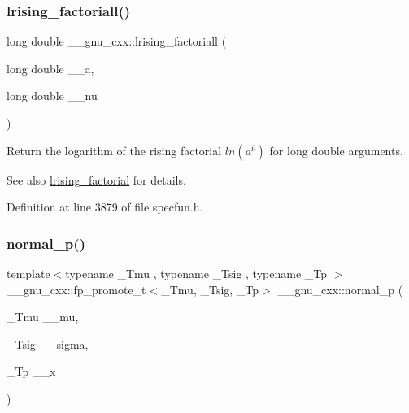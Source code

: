 \subsubsection{\texorpdfstring{lrising\+\_\+factoriall()}{lrising\_factoriall()}}
{\footnotesize\ttfamily long double \+\_\+\+\_\+gnu\+\_\+cxx\+::lrising\+\_\+factoriall (\begin{DoxyParamCaption}\item[{long double}]{\+\_\+\+\_\+a,  }\item[{long double}]{\+\_\+\+\_\+nu }\end{DoxyParamCaption})\hspace{0.3cm}{\ttfamily [inline]}}

Return the logarithm of the rising factorial $ ln(a^{\overline{\nu}}) $ for {\ttfamily  long double } arguments.

\begin{DoxySeeAlso}{See also}
\hyperlink{group__gnu__math__spec__func_ga8912b75b2f7592fb61128c766e7313b9}{lrising\+\_\+factorial} for details. 
\end{DoxySeeAlso}


Definition at line 3879 of file specfun.\+h.

\mbox{\label{group__gnu__math__spec__func_gaeb735b0fb98c7684ba61b8940f50193c}} 
\subsubsection{\texorpdfstring{normal\+\_\+p()}{normal\_p()}}
{\footnotesize\ttfamily template$<$typename \+\_\+\+Tmu , typename \+\_\+\+Tsig , typename \+\_\+\+Tp $>$ \\
\+\_\+\+\_\+gnu\+\_\+cxx\+::fp\+\_\+promote\+\_\+t$<$\+\_\+\+Tmu, \+\_\+\+Tsig, \+\_\+\+Tp$>$ \+\_\+\+\_\+gnu\+\_\+cxx\+::normal\+\_\+p (\begin{DoxyParamCaption}\item[{\+\_\+\+Tmu}]{\+\_\+\+\_\+mu,  }\item[{\+\_\+\+Tsig}]{\+\_\+\+\_\+sigma,  }\item[{\+\_\+\+Tp}]{\+\_\+\+\_\+x }\end{DoxyParamCaption})\hspace{0.3cm}{\ttfamily [inline]}}



